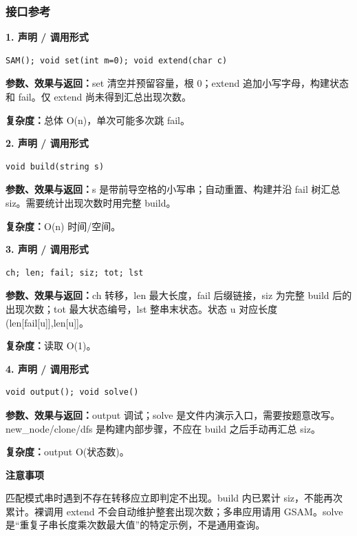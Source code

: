 \documentclass[UTF8,a4paper,10pt]{ctexart}
\newcommand{\TemplNote}[1]{\textbf{注意事项}\par #1\par}
\begin{document}
\subsubsection*{接口参考}
\noindent\begin{minipage}{\textwidth}
\textbf{1. 声明 / 调用形式}
\begin{lstlisting}
SAM(); void set(int m=0); void extend(char c)
\end{lstlisting}
\textbf{参数、效果与返回：}set 清空并预留容量，根 0；extend 追加小写字母，构建状态和 fail。仅 extend 尚未得到汇总出现次数。

\textbf{复杂度：}总体 O(n)，单次可能多次跳 fail。

\end{minipage}\par\vspace{0.4em}
\noindent\begin{minipage}{\textwidth}
\textbf{2. 声明 / 调用形式}
\begin{lstlisting}
void build(string s)
\end{lstlisting}
\textbf{参数、效果与返回：}s 是带前导空格的小写串；自动重置、构建并沿 fail 树汇总 siz。需要统计出现次数时用完整 build。

\textbf{复杂度：}O(n) 时间/空间。

\end{minipage}\par\vspace{0.4em}
\noindent\begin{minipage}{\textwidth}
\textbf{3. 声明 / 调用形式}
\begin{lstlisting}
ch; len; fail; siz; tot; lst
\end{lstlisting}
\textbf{参数、效果与返回：}ch 转移，len 最大长度，fail 后缀链接，siz 为完整 build 后的出现次数；tot 最大状态编号，lst 整串末状态。状态 u 对应长度 (len[fail[u]],len[u]]。

\textbf{复杂度：}读取 O(1)。

\end{minipage}\par\vspace{0.4em}
\noindent\begin{minipage}{\textwidth}
\textbf{4. 声明 / 调用形式}
\begin{lstlisting}
void output(); void solve()
\end{lstlisting}
\textbf{参数、效果与返回：}output 调试；solve 是文件内演示入口，需要按题意改写。new\_node/clone/dfs 是构建内部步骤，不应在 build 之后手动再汇总 siz。

\textbf{复杂度：}output O(状态数)。

\TemplNote{匹配模式串时遇到不存在转移应立即判定不出现。build 内已累计 siz，不能再次累计。裸调用 extend 不会自动维护整套出现次数；多串应用请用 GSAM。solve 是“重复子串长度乘次数最大值”的特定示例，不是通用查询。}
\end{minipage}\par\vspace{0.4em}
\clearpage
\end{document}
